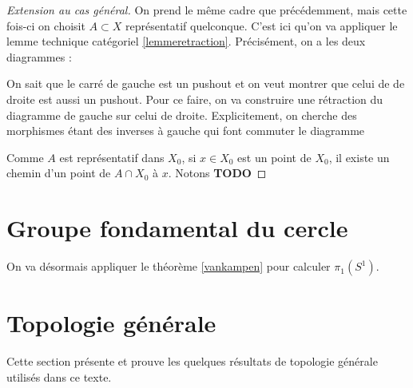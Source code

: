 \documentclass{article}
\theoremstyle{definition}
\theoremstyle{remark}
\newcommand{\todo}{\textbf{TODO}}
\begin{document}
\begin{proof}[Extension au cas général]
    On prend le même cadre que précédemment, mais cette fois-ci on choisit $A \subset X$ représentatif quelconque. C'est ici qu'on va appliquer le lemme technique catégoriel \ref{lemmeretraction}. Précisément, on a les deux diagrammes :
    \begin{center}
        \hspace{2em}
    \end{center}
    On sait que le carré de gauche est un pushout et on veut montrer que celui de de droite est aussi un pushout. Pour ce faire, on va construire une rétraction du diagramme de gauche sur celui de droite. Explicitement, on cherche des morphismes étant des inverses à gauche qui font commuter le diagramme
    \begin{center}
    \end{center}
    Comme $A$ est représentatif dans $X_0$, si $x \in X_0$ est un point de $X_0$, il existe un chemin d'un point de $A \cap X_0$ à $x$. Notons \todo
\end{proof}

\section{Groupe fondamental du cercle}

On va désormais appliquer le théorème \ref{vankampen} pour calculer $\pi_1(S^1)$.


\appendix

\section{Topologie générale}

Cette section présente et prouve les quelques résultats de topologie générale utilisés dans ce texte.
\end{document}
